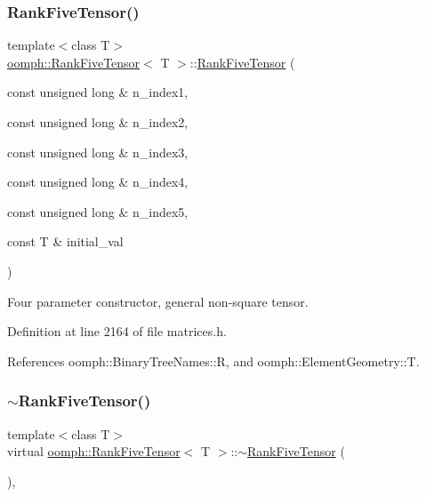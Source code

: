 \subsubsection{\texorpdfstring{Rank\+Five\+Tensor()}{RankFiveTensor()}\hspace{0.1cm}{\footnotesize\ttfamily [5/5]}}
{\footnotesize\ttfamily template$<$class T$>$ \\
\hyperlink{classoomph_1_1RankFiveTensor}{oomph\+::\+Rank\+Five\+Tensor}$<$ T $>$\+::\hyperlink{classoomph_1_1RankFiveTensor}{Rank\+Five\+Tensor} (\begin{DoxyParamCaption}\item[{const unsigned long \&}]{n\+\_\+index1,  }\item[{const unsigned long \&}]{n\+\_\+index2,  }\item[{const unsigned long \&}]{n\+\_\+index3,  }\item[{const unsigned long \&}]{n\+\_\+index4,  }\item[{const unsigned long \&}]{n\+\_\+index5,  }\item[{const T \&}]{initial\+\_\+val }\end{DoxyParamCaption})\hspace{0.3cm}{\ttfamily [inline]}}



Four parameter constructor, general non-\/square tensor. 



Definition at line 2164 of file matrices.\+h.



References oomph\+::\+Binary\+Tree\+Names\+::R, and oomph\+::\+Element\+Geometry\+::T.

\mbox{\label{classoomph_1_1RankFiveTensor_aee507ed9367b053bcf538b3eaaf62d03}} 
\subsubsection{\texorpdfstring{$\sim$\+Rank\+Five\+Tensor()}{~RankFiveTensor()}}
{\footnotesize\ttfamily template$<$class T$>$ \\
virtual \hyperlink{classoomph_1_1RankFiveTensor}{oomph\+::\+Rank\+Five\+Tensor}$<$ T $>$\+::$\sim$\hyperlink{classoomph_1_1RankFiveTensor}{Rank\+Five\+Tensor} (\begin{DoxyParamCaption}{ }\end{DoxyParamCaption})\hspace{0.3cm}{\ttfamily [inline]}, {\ttfamily [virtual]}}




